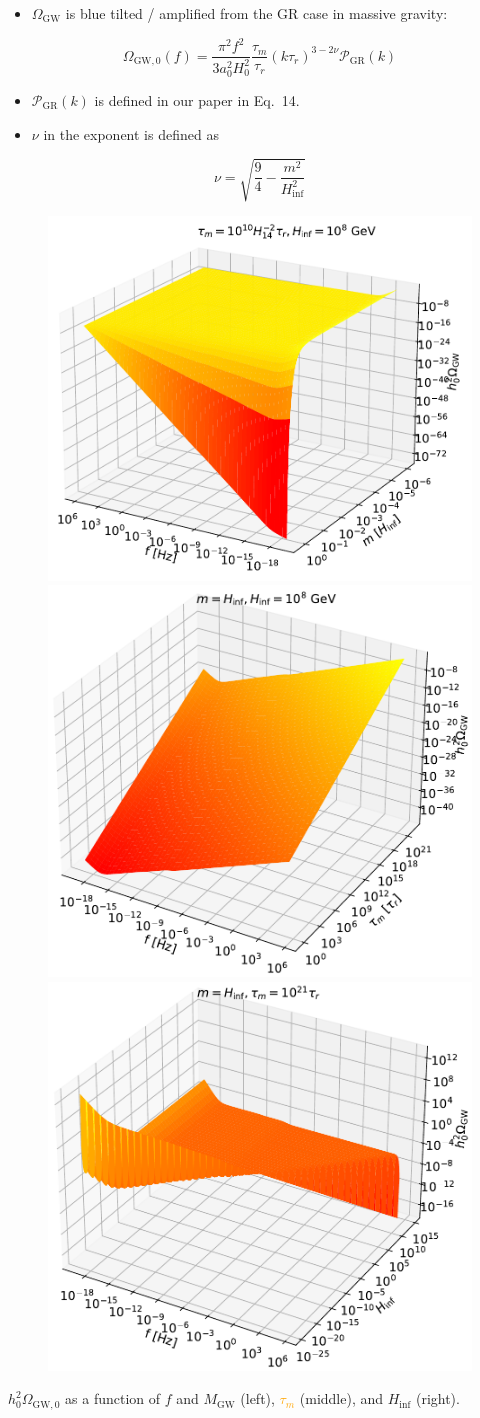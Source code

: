 \documentclass{beamer}                             %
\begin{document}
\begin{frame}[t]
\begin{columns}[T]
\begin{column}{0.30\textwidth}
\begin{tcolorbox}
    \begin{itemize}
        \item $\Omega_{\text{GW}}$ is blue tilted / amplified from the GR case in massive gravity:
    \end{itemize}
    $$\Omega_{\text{GW},0}(f) = \frac{\pi^2f^2}{3a_0^2 H_0^2}\frac{\tau_m}{\tau_r}(k\tau_r)^{3-2\nu}\mathcal{P}_{\text{GR}}(k)$$
    \begin{itemize}
        \item $\mathcal{P}_{\text{GR}}(k)$ is defined in our paper \cite{Choi:2023tun} in Eq.\ 14.
        \item $\nu$ in the exponent is defined as 
    \end{itemize}
    $$\nu = \sqrt{\frac{9}{4} - \frac{m^2}{H_{\inf}^2}}$$
     \begin{figure}[t]
          \includegraphics[width=.32\linewidth]{fig4a.pdf} 
          \includegraphics[width=.32\linewidth]{fig4b.pdf} 
          \includegraphics[width=.32\linewidth]{fig4c.pdf} 
          \label{fig:contours}
        \end{figure}
     $h_0^2\Omega_{\text{GW},0}$ as a function of $f$ and \textcolor{darksilver}{$M_{\text{GW}}$} (left), \textcolor{orange}{$\tau_m$} (middle), and \textcolor{rust}{$H_{\text{inf}}$} (right). 
  \end{tcolorbox}
  

\end{column}
\end{columns}
\end{frame}
\end{document}
